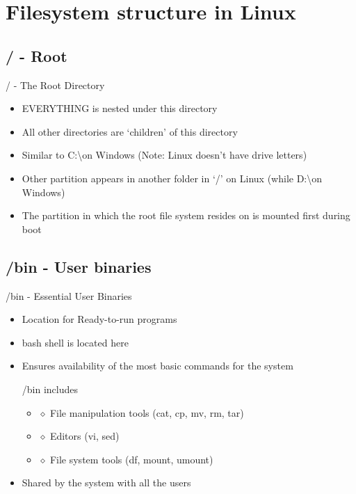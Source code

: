 \documentclass{beamer}
\begin{document}
\section{Filesystem structure in Linux}
\subsection{/ - Root }

\begin{frame}{/ - The Root Directory}

\begin{itemize}
 \setlength\itemsep{0.8em}
\item <1-> EVERYTHING is nested under this directory
\item <2-> All other directories are `children' of this directory 
\item <3->  Similar to C:\textbackslash  on Windows (Note: Linux doesn't have drive letters)
\item <4-> Other partition appears in another folder in `/' on Linux (while D:\textbackslash on Windows)
\item <5-> The partition in which the root file system resides on is mounted first during boot 

\end{itemize}
\end{frame}

\subsection{/bin - User binaries}
\begin{frame}{/bin - Essential User Binaries}
\begin{itemize}
 \setlength\itemsep{0.8em}
\item <1-> Location for Ready-to-run programs 
\item <2-> bash shell is located here
\item <3-> Ensures availability of the most basic commands for the system
\begin{block}{/bin includes }
\begin{itemize}
\item[] $\diamond$ File manipulation tools (cat, cp, mv, rm, tar)
\item[] $\diamond$ Editors (vi, sed)
\item[] $\diamond$ File system tools (df, mount, umount)
\end{itemize}

\end{block}
\item <4-> Shared by the system with all the users
\end{itemize}
\end{frame}
\end{document}
